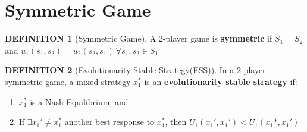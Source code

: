 \documentclass[12pt]{article}
\theoremstyle{definition}
\newtheorem*{definition}{DEFINITION}
\begin{document}
\section{Symmetric Game}
    \begin{definition}[Symmetric Game]
        A 2-player game is \textbf{symmetric} if $S_1 = S_2$ and $u_1(s_1,s_2) = u_2(s_2,s_1) \ \forall s_1,s_2 \in S_1 $
    \end{definition}
    \begin{definition}[Evolutionarity Stable Strategy(ESS)]
        In a 2-player symmetric game, a mixed strategy $x_1^*$ is an \textbf{evolutionarity stable strategy} if:
            \begin{enumerate}
                \item $x_1^*$ is a Nash Equilibrium, and
                \item If $\exists x_1' \neq x_1^*$ another best response to $x_1^*$, then $U_1(x_1',x_1') < U_1(x_1*,x_1')$
            \end{enumerate}
    \end{definition}
\end{document}
